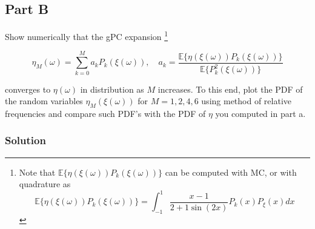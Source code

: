 \documentclass[
]{article}
\begin{document}
\subsection{Part B}\label{part-b-1}

Show numerically that the gPC expansion \footnote{Note that
  \(\mathbb{E}\{\eta(\xi(\omega))P_k(\xi(\omega))\}\) can be computed
  with MC, or with quadrature as
  \begin{equation}\tag{4}\label{four}\mathbb{E}\{\eta(\xi(\omega))P_k(\xi(\omega))\}= \int_{-1}^{1}\frac{x - 1}{2 + 1 \sin(2x)}P_k(x)P_\xi(x)dx\end{equation}}

\begin{equation}\tag{5}\label{gpc}
\eta_M(\omega) = \sum_{k=0}^{M}a_k P_k(\xi(\omega)), \quad a_k = \frac{\mathbb{E}\{\eta(\xi(\omega))P_k(\xi(\omega))\}}{\mathbb{E}\{P_k^2(\xi(\omega))\}}
\end{equation}

converges to \(\eta(\omega)\) in distribution as \(M\) increases. To
this end, plot the PDF of the random variables \(\eta_M(\xi(\omega))\)
for \(M = 1, 2, 4, 6\) using method of relative frequencies and compare
such PDF's with the PDF of \(\eta\) you computed in part a.

\subsubsection{Solution}\label{solution-4}
\end{document}
